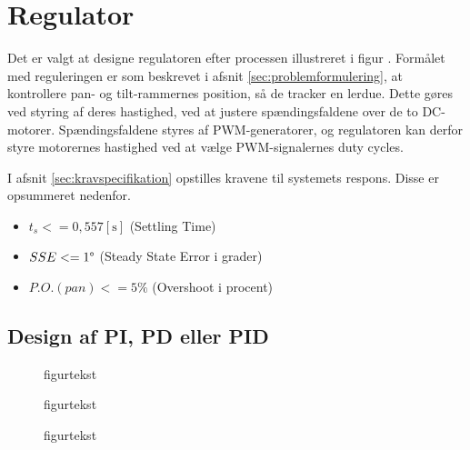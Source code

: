 \section{Regulator}
\label{sec:kontrollerdeign}
Det er valgt at designe regulatoren efter processen illustreret i figur .%
Formålet med reguleringen er som beskrevet i afsnit \ref{sec:problemformulering},
at kontrollere pan- og tilt-rammernes position, så de tracker en lerdue.
Dette gøres ved styring af deres hastighed, ved at justere spændingsfaldene over de
to DC-motorer. Spændingsfaldene styres af PWM-generatorer, og regulatoren
kan derfor styre motorernes hastighed ved at vælge PWM-signalernes duty cycles.

I afsnit \ref{sec:kravspecifikation} opstilles kravene til systemets respons.
Disse er opsummeret nedenfor.
\begin{itemize}
\item \(t_{s} <= 0,557 \mathrm{\left[s\right]}\) (Settling Time)
\item \(SSE <= 1 \degree\) (Steady State Error i grader)
\item \(P.O. (pan) <= 5 \%\) (Overshoot i procent)
\end{itemize}


\subsection{Design af PI, PD eller PID}
\begin{figure}[!th]
\centering
\begin{tikzpicture}[auto, node distance=2.6cm,>=latex']

\end{tikzpicture}
\caption[tekst i indholdsfortegnelsen]{figurtekst}
\label{fig:}
\end{figure}

\begin{figure}[!th]
\centering
\begin{tikzpicture}[auto, node distance=2.6cm,>=latex']

\end{tikzpicture}
\caption[tekst i indholdsfortegnelsen]{figurtekst}
\label{fig:}
\end{figure}

\begin{figure}[!th]
\centering
\begin{tikzpicture}[auto, node distance=2.6cm,>=latex']

\end{tikzpicture}
\caption[tekst i indholdsfortegnelsen]{figurtekst}
\label{fig:}
\end{figure}